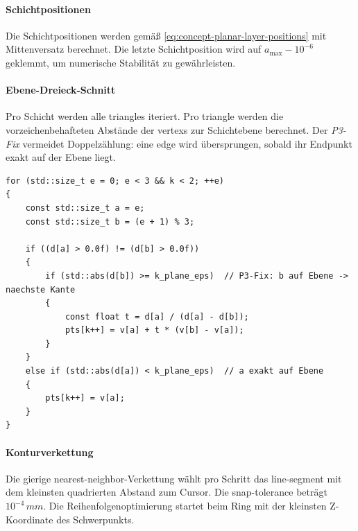                 \paragraph{Schichtpositionen}\label{para:impl-planar-layer-positions}
                    Die Schichtpositionen werden gemäß \cref{eq:concept-planar-layer-positions} mit Mittenversatz berechnet.
                    Die letzte Schichtposition wird auf $a_{\max} - 10^{-6}$ geklemmt, um numerische Stabilität zu gewährleisten.

                \paragraph{Ebene-Dreieck-Schnitt}\label{para:impl-planar-intersection}
                    Pro Schicht werden alle \glspl{triangle} iteriert.
                    Pro \gls{triangle} werden die vorzeichenbehafteten Abstände der \glspl{vertex} zur Schichtebene berechnet.
                    Der \emph{P3-Fix} vermeidet Doppelzählung: eine \gls{edge} wird übersprungen, sobald ihr Endpunkt exakt auf der Ebene liegt.

\begin{lstlisting}[style=cppStyle, caption={Schnittberechnung mit P3-Fix (vereinfacht).}, label={lst:impl-planar-intersection}]
for (std::size_t e = 0; e < 3 && k < 2; ++e)
{
    const std::size_t a = e;
    const std::size_t b = (e + 1) % 3;

    if ((d[a] > 0.0f) != (d[b] > 0.0f))
    {
        if (std::abs(d[b]) >= k_plane_eps)  // P3-Fix: b auf Ebene -> naechste Kante
        {
            const float t = d[a] / (d[a] - d[b]);
            pts[k++] = v[a] + t * (v[b] - v[a]);
        }
    }
    else if (std::abs(d[a]) < k_plane_eps)  // a exakt auf Ebene
    {
        pts[k++] = v[a];
    }
}
\end{lstlisting}

                \paragraph{Konturverkettung}\label{para:impl-planar-chaining}
                    Die gierige \gls{nearest-neighbor}-Verkettung wählt pro Schritt das \gls{line-segment} mit dem kleinsten quadrierten Abstand zum Cursor.
                    Die \gls{snap-tolerance} beträgt $10^{-4}\,\si{mm}$.
                    Die Reihenfolgenoptimierung startet beim Ring mit der kleinsten Z-Koordinate des Schwerpunkts.

